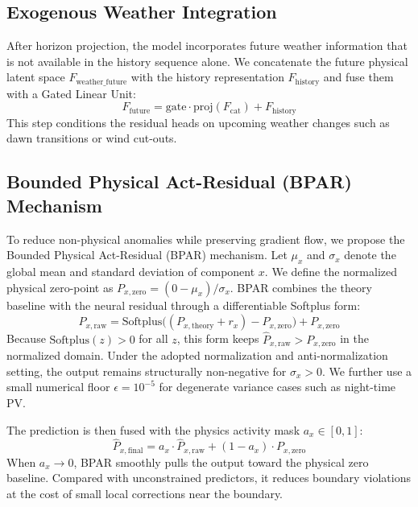 \subsection{Exogenous Weather Integration}
After horizon projection, the model incorporates future weather information that is not available in the history sequence alone. We concatenate the future physical latent space $F_{\text{weather\_future}}$ with the history representation $F_{\text{history}}$ and fuse them with a Gated Linear Unit:
\begin{equation}
    F_{\text{future}} = \text{gate} \cdot \text{proj}(F_{\text{cat}}) + F_{\text{history}}
\end{equation}
This step conditions the residual heads on upcoming weather changes such as dawn transitions or wind cut-outs.

\subsection{Bounded Physical Act-Residual (BPAR) Mechanism} \label{subsec:bpar}
To reduce non-physical anomalies while preserving gradient flow, we propose the Bounded Physical Act-Residual (BPAR) mechanism. Let $\mu_x$ and $\sigma_x$ denote the global mean and standard deviation of component $x$. We define the normalized physical zero-point as $P_{x,\text{zero}} = (0 - \mu_x) / \sigma_x$. BPAR combines the theory baseline with the neural residual through a differentiable Softplus form:
\begin{equation}
    \hat{P}_{x,\text{raw}} = \text{Softplus}\Big((P_{x,\text{theory}} + r_x) - P_{x,\text{zero}}\Big) + P_{x,\text{zero}}
\label{eq:bpar}
\end{equation}
Because $\text{Softplus}(z) > 0$ for all $z$, this form keeps $\hat{P}_{x,\text{raw}} > P_{x,\text{zero}}$ in the normalized domain. Under the adopted normalization and anti-normalization setting, the output remains structurally non-negative for $\sigma_x > 0$. We further use a small numerical floor $\epsilon=10^{-5}$ for degenerate variance cases such as night-time PV.

The prediction is then fused with the physics activity mask $a_x \in [0, 1]$:
\begin{equation}
    \hat{P}_{x,\text{final}} = a_x \cdot \hat{P}_{x,\text{raw}} + (1 - a_x) \cdot P_{x,\text{zero}}
\label{eq:activity_mask}
\end{equation}
When $a_x \to 0$, BPAR smoothly pulls the output toward the physical zero baseline. Compared with unconstrained predictors, it reduces boundary violations at the cost of small local corrections near the boundary.

